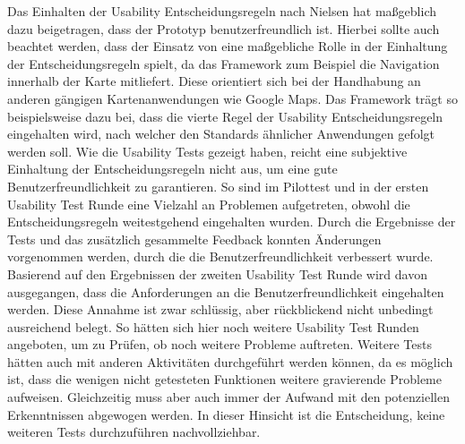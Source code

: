 Das Einhalten der Usability Entscheidungsregeln nach Nielsen \cite{Nielsen.1994} hat maßgeblich dazu beigetragen, dass der Prototyp benutzerfreundlich ist. Hierbei sollte auch beachtet werden, dass der Einsatz von \deckgl{} eine maßgebliche Rolle in der Einhaltung der Entscheidungsregeln spielt, da das Framework zum Beispiel die Navigation innerhalb der Karte mitliefert. Diese orientiert sich bei der Handhabung an anderen gängigen Kartenanwendungen wie Google Maps. Das Framework trägt so beispielsweise dazu bei, dass die vierte Regel der Usability Entscheidungsregeln eingehalten wird, nach welcher den Standards ähnlicher Anwendungen gefolgt werden soll. Wie die Usability Tests gezeigt haben, reicht eine subjektive Einhaltung der Entscheidungsregeln nicht aus, um eine gute Benutzerfreundlichkeit zu garantieren. So sind im Pilottest und in der ersten Usability Test Runde eine Vielzahl an Problemen aufgetreten, obwohl die Entscheidungsregeln weitestgehend eingehalten wurden. Durch die Ergebnisse der Tests und das zusätzlich gesammelte Feedback konnten Änderungen vorgenommen werden, durch die die Benutzerfreundlichkeit verbessert wurde. Basierend auf den Ergebnissen der zweiten Usability Test Runde wird davon ausgegangen, dass die Anforderungen an die Benutzerfreundlichkeit eingehalten werden. Diese Annahme ist zwar schlüssig, aber rückblickend nicht unbedingt ausreichend belegt. So hätten sich hier noch weitere Usability Test Runden angeboten, um zu Prüfen, ob noch weitere Probleme auftreten. Weitere Tests hätten auch mit anderen Aktivitäten durchgeführt werden können, da es möglich ist, dass die wenigen nicht getesteten Funktionen weitere gravierende Probleme aufweisen. Gleichzeitig muss aber auch immer der Aufwand mit den potenziellen Erkenntnissen abgewogen werden. In dieser Hinsicht ist die Entscheidung, keine weiteren Tests durchzuführen nachvollziehbar.

